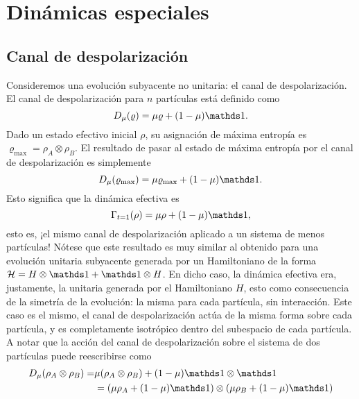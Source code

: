 \section{Dinámicas especiales}
\subsection{Canal de despolarización}

Consideremos una evolución subyacente no unitaria: el canal de despolarización. El canal de despolarización para $n$ partículas está definido como
\begin{equation*}
    D_{\mu}(\varrho)=\mu\varrho+(1-\mu)\Id.
\end{equation*}
Dado un estado efectivo inicial $\rho$, su asignación de máxima entropía es $\varrho_{\max}=\rho_{A}\otimes\rho_{B}$. El resultado de pasar al estado de máxima entropía por el canal de despolarización es simplemente
\begin{equation*}
    D_{\mu}(\varrho_{\max})=\mu\varrho_{\max}+(1-\mu)\Id.
\end{equation*}
Esto significa que la dinámica efectiva es
\begin{equation*}
    \Gamma_{t=1}(\rho)=\mu\rho+(1-\mu)\Id,
\end{equation*}
esto es, ¡el mismo canal de despolarización aplicado a un sistema de menos partículas! Nótese que este resultado es muy similar al obtenido para una evolución unitaria subyacente generada por un Hamiltoniano de la forma $\mcH=H\otimes\Id+\Id\otimes H$. En dicho caso, la dinámica efectiva era, justamente, la unitaria generada por el Hamiltoniano $H$, esto como consecuencia de la simetría de la evolución: la misma para cada partícula, sin interacción. Este caso es el mismo, el canal de despolarización actúa de la misma forma sobre cada partícula, y es completamente isotrópico dentro del subespacio de cada partícula. A notar que la acción del canal de despolarización sobre el sistema de dos partículas puede reescribirse como 
\begin{align*}
    D_{\mu}(\rho_{A}\otimes\rho_{B})=&\mu(\rho_{A}\otimes\rho_{B})+(1-\mu)\Id\otimes\Id\\
    &=(\mu\rho_{A}+(1-\mu)\Id)\otimes(\mu\rho_{B}+(1-\mu)\Id)
\end{align*}

